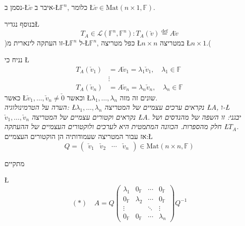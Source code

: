 \documentclass[english,hebrew]{article}
\begin{document}
נסמן ב-\L{$\check{v}$} איבר ב-\L{$\mathbb{F}^{n}$}, כלומר \L{$\check{v}\in\text{Mat}(n\times1,\mathbb{F})$}. 

בנוסף נגדיר\L{%
\[
T_{A}\in\mathcal{L}(\mathbb{F}^{n},\mathbb{F}^{n}):T_{A}(\check{v})\overset{\text{def}}{=}A\check{v}
\]
}%
)זו העתקה לינארית מ-\L{$\mathbb{F}^{n}$} ל-\L{$\mathbb{F}^{n}$},
כפל מטריצה \L{$n\times n$} במטריצה \L{$n\times1$}.(

נניח כי \L{%
\begin{align*}
T_{A}(\check{v}_{1}) & =A\check{v}_{1}=\lambda_{1}\check{v}_{1},\quad\lambda_{1}\in\mathbb{F}\\
 & \vdots\\
T_{A}(\check{v}_{n}) & =A\check{v}_{n}=\lambda_{n}\check{v}_{n},\quad\lambda_{n}\in\mathbb{F}
\end{align*}
}%
כאשר \L{$\check{v}_{1},\dots,\check{v}_{n}\neq\check{0}$} וכאשר \L{$\lambda_{1},\dots,\lambda_{n}$}
שונים זה מזה.\\

\emph{הערה על הטרמינולוגיה: \L{$\lambda_{1},\dots,\lambda_{n}$} נקראים
ערכים עצמיים של המטריצה \L{$A$}, ו-\L{$\check{v}_{1},\dots,\check{v}_{n}$}
נקראים וקטורים עצמיים של המטריצה \L{$A$}. יבגני: זו השפה של מהנדסים
ושל חלק מהספרות. הכוונה המתמטית היא לערכים ולוקטורים העצמיים של ההעתקה
\L{$T_{A}$}.}\\

אז עבור המטריצה שעמודותיה הן הוקטורים העצמיים:\L{%
\[
Q=\begin{pmatrix}\check{v}_{1} & \check{v}_{2} & \cdots & \check{v}_{n}\end{pmatrix}\in\text{Mat}(n\times n,\mathbb{F})
\]
}%

מתקיים

\L{%
\[
(*)\quad A=Q\begin{pmatrix}\lambda_{1} & 0_{\mathbb{F}} & \cdots & 0_{\mathbb{F}}\\
0_{\mathbb{F}} & \lambda_{2} & \cdots & 0_{\mathbb{F}}\\
\vdots &  & \ddots & \vdots\\
0_{\mathbb{F}} & 0_{\mathbb{F}} & \cdots & \lambda_{n}
\end{pmatrix}Q^{-1}
\]
}%
\end{document}
